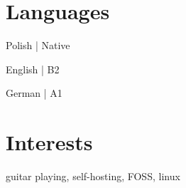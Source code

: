 \documentclass{article}
\newcommand\VRule{\color{lightgray}\vrule width 0.5pt}
\begin{document}



\section*{Languages}
\begin{minipage}[ht]{.3\textwidth}
\centering
Polish | Native
\end{minipage}
\begin{minipage}[ht]{.3\textwidth}
\centering
English | B2
\end{minipage}
\begin{minipage}[ht]{.3\textwidth}
\centering
German | A1
\end{minipage}


\section*{Interests}
guitar playing, self-hosting, FOSS, linux
\end{document}
